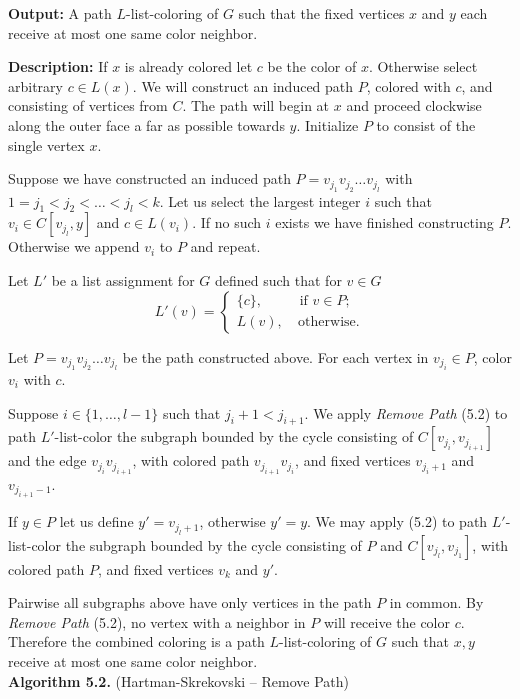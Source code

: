 \documentclass[letterpaper, 12pt]{article}
\theoremstyle{definition}
\theoremstyle{definition}
\theoremstyle{thm}
\theoremstyle{definition}
\begin{document}
\noindent\textbf{Output:} A path $L$-list-coloring of $G$ such that the fixed
vertices $x$ and $y$ each receive at most one same color neighbor.

\noindent\textbf{Description:} If $x$ is already colored
let $c$ be the color of $x$. Otherwise select arbitrary $c\in L(x)$. We will 
construct an induced path $P$, colored with $c$, and consisting of vertices from
$C$. The path will begin at $x$ and proceed clockwise along the outer face a
far as possible towards $y$. Initialize $P$ to consist of the single vertex
$x$.

Suppose we have constructed an induced path $P=v_{j_1}v_{j_2}\ldots v_{j_l}$
with $1=j_1<j_2<\ldots<j_l< k$. Let us select the largest integer $i$ such
that $v_i\in C[v_{j_l},y]$ and $c\in L(v_i)$. If no such $i$ exists we have
finished constructing $P$. Otherwise we append $v_i$ to $P$ and repeat.

Let $L'$ be a list assignment for $G$ defined such that for $v\in G$
\[
	L'(v) = \begin{cases}
				\{c\}, & \text{ if } v\in P;\\
				L(v), & \ \text{otherwise}.
			\end{cases}
\]

Let $P=v_{j_1}v_{j_2}\ldots v_{j_l}$ be the path constructed above.
For each vertex in $v_{j_i}\in P$, color $v_i$ with $c$.

Suppose
$i\in\{1,\ldots,l-1\}$ such that $j_i+1<j_{i+1}$. We apply \textit{Remove Path}
(5.2) to path $L'$-list-color the subgraph bounded by the cycle consisting of
$C[v_{j_i},v_{j_{i+1}}]$ and the edge $v_{j_i}v_{j_{i+1}}$, with colored path
$v_{j_{i+1}}v_{j_i}$, and fixed vertices $v_{j_i+1}$ and $v_{j_{i+1}-1}$.

If $y\in P$ let us define $y'=v_{j_l+1}$, otherwise $y'=y$.
We may apply  (5.2) to path $L'$-list-color the
subgraph bounded by the cycle consisting of $P$ and $C[v_{j_l},v_{j_1}]$, with
colored path $P$, and fixed vertices $v_k$ and $y'$.

Pairwise all subgraphs above have only vertices in the path $P$ in common.
By \textit{Remove Path} (5.2), no vertex with a neighbor in $P$ will
receive the color $c$. Therefore the combined coloring is a path
$L$-list-coloring of $G$ such that $x,y$ receive at most one same color
neighbor.\\

\noindent\textbf{Algorithm 5.2.} (Hartman-Skrekovski -- Remove Path)
\end{document}
